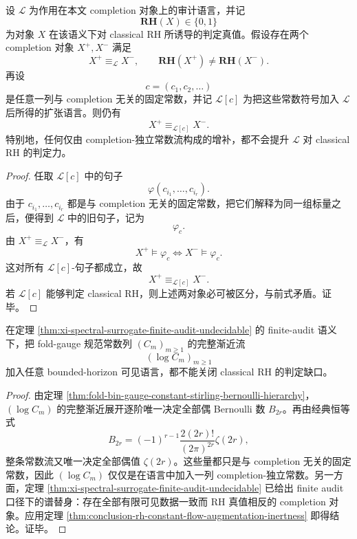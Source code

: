 \begin{theorem}[常数流增补的不增判别原理]\label{thm:conclusion-rh-constant-flow-augmentation-inertness}
设 \(\mathcal L\) 为作用在本文 completion 对象上的审计语言，并记
\[
\mathbf{RH}(X)\in\{0,1\}
\]
为对象 \(X\) 在该语义下对 classical RH 所诱导的判定真值。假设存在两个 completion 对象 \(X^+,X^-\) 满足
\[
X^+\equiv_{\mathcal L}X^-,
\qquad
\mathbf{RH}(X^+)\neq \mathbf{RH}(X^-).
\]
再设
\[
c=(c_1,c_2,\dots)
\]
是任意一列与 completion 无关的固定常数，并记 \(\mathcal L[c]\) 为把这些常数符号加入 \(\mathcal L\) 后所得的扩张语言。则仍有
\[
X^+\equiv_{\mathcal L[c]}X^-.
\]
特别地，任何仅由 completion-独立常数流构成的增补，都不会提升 \(\mathcal L\) 对 classical RH 的判定力。
\end{theorem}
\begin{proof}
任取 \(\mathcal L[c]\) 中的句子
\[
\varphi(c_{i_1},\dots,c_{i_r}).
\]
由于 \(c_{i_1},\dots,c_{i_r}\) 都是与 completion 无关的固定常数，把它们解释为同一组标量之后，便得到 \(\mathcal L\) 中的旧句子，记为
\[
\varphi_c.
\]
由 \(X^+\equiv_{\mathcal L}X^-\)，有
\[
X^+\models \varphi_c
\iff
X^-\models \varphi_c.
\]
这对所有 \(\mathcal L[c]\)-句子都成立，故
\[
X^+\equiv_{\mathcal L[c]}X^-.
\]
若 \(\mathcal L[c]\) 能够判定 classical RH，则上述两对象必可被区分，与前式矛盾。证毕。
\end{proof}

\begin{corollary}\label{cor:conclusion-rh-stirling-bernoulli-completion-inertness}
在定理 \ref{thm:xi-spectral-surrogate-finite-audit-undecidable} 的 finite-audit 语义下，把 fold-gauge 规范常数列 \((C_m)_{m\ge 1}\) 的完整渐近流
\[
(\log C_m)_{m\ge 1}
\]
加入任意 bounded-horizon 可见语言，都不能关闭 classical RH 的判定缺口。
\end{corollary}
\begin{proof}
由定理 \ref{thm:fold-bin-gauge-constant-stirling-bernoulli-hierarchy}，\((\log C_m)\) 的完整渐近展开逐阶唯一决定全部偶 Bernoulli 数 \(B_{2r}\)。再由经典恒等式
\[
B_{2r}=(-1)^{r-1}\frac{2(2r)!}{(2\pi)^{2r}}\zeta(2r),
\]
整条常数流又唯一决定全部偶值 \(\zeta(2r)\)。这些量都只是与 completion 无关的固定常数，因此 \((\log C_m)\) 仅仅是在语言中加入一列 completion-独立常数。另一方面，定理 \ref{thm:xi-spectral-surrogate-finite-audit-undecidable} 已给出 finite audit 口径下的谱替身：存在全部有限可见数据一致而 RH 真值相反的 completion 对象。应用定理 \ref{thm:conclusion-rh-constant-flow-augmentation-inertness} 即得结论。证毕。
\end{proof}

